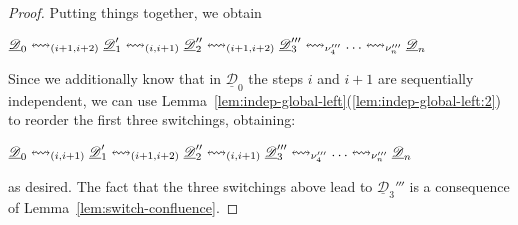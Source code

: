 \documentclass[a4paper,UKenglish,cleveref,pdftex, thm-restate,numberwithinsect,anonymous]{lipics}
\newcommand{\dder}[1]{\mathscr{#1}}
\newcommand{\der}[1]{\underline{\dder{#1}}}
\newcommand{\shift}[1]{\ensuremath{\mathrel{{\leftrightsquigarrow}_{#1}}}}
\begin{document}
\begin{proof}
  Putting things together, we obtain
  \begin{center}
    $\der{D}_0 \shift{\transp{i+1}[i+2]} \der{D}_1' \shift{\transp{i}}
    \der{D}_2'' \shift{\transp{i+1}[i+2]} \der{D}_3''' \shift{\nu_4'''}\ldots \shift{\nu_n'''} \der{D}_n$
  \end{center}
  Since we additionally know that in $\der{D}_0$ the steps $i$ and
  $i+1$ are sequentially independent, we can use
  Lemma~\ref{lem:indep-global-left}(\ref{lem:indep-global-left:2}) to
  reorder the first three switchings, obtaining:
  \begin{center}
    $\der{D}_0 \shift{\transp{i}} \der{D}_1' \shift{\transp{i+1}[i+2]}
    \der{D}_2'' \shift{\transp{i}} \der{D}_3''' \shift{\nu_4'''}\ldots \shift{\nu_n'''} \der{D}_n$
  \end{center}
  as desired.  The fact that the three switchings above lead to
  $\der{D}_3'''$ is a consequence of Lemma~\ref{lem:switch-confluence}.
\end{proof}
\end{document}
